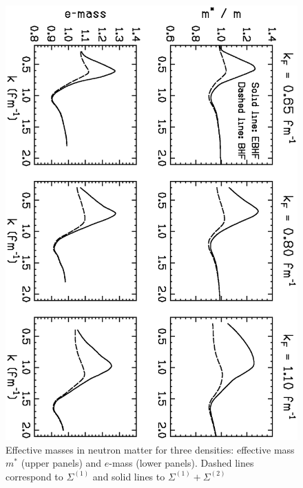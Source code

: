 \documentclass[runningheads]{svmult}
\def\sig{\Sigma}
\begin{document}
\begin{figure}[b] %
\includegraphics[height=.32\textheight,angle=90,bb=30 390 490 750]
{nsbk_mef.ps}
\caption[]
{Effective masses in neutron matter for three densities: 
 effective mass $m^*$ (upper panels) and $e$-mass (lower panels). 
 Dashed lines correspond to $\sig^{(1)}$ and solid lines to 
 $\sig^{(1)}+\sig^{(2)}$}
\label{f:OFFMS}
\end{figure} %
\end{document}
